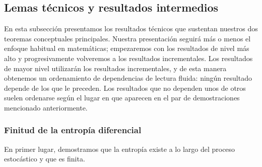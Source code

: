 \documentclass[../../book-main_es.tex]{subfiles}
\begin{document}
\subsection{Lemas técnicos y resultados
intermedios}\label{sub:app_diffusion_intermediate_results}

En esta subsección presentamos los resultados técnicos que sustentan nuestros dos
teoremas conceptuales principales. Nuestra presentación seguirá más o menos
el enfoque habitual en matemáticas; empezaremos con los resultados de nivel más alto
y progresivamente volveremos a los resultados incrementales. Los
resultados de mayor nivel utilizarán los resultados incrementales, y de esta
manera obtenemos un ordenamiento de dependencias de lectura fluida: ningún
resultado depende de los que le preceden. Los resultados que no dependen
unos de otros suelen ordenarse según el lugar en que aparecen en el
par de demostraciones mencionado anteriormente.

\subsubsection{Finitud de la entropía diferencial}

En primer lugar, demostramos que la entropía existe a lo largo del proceso estocástico
y que es finita.
\end{document}
